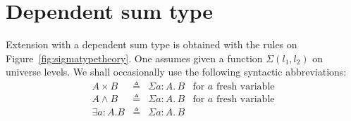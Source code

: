 \documentclass{article}
\newcommand{\defeq}{\triangleq}
\newcommand{\mksig}[3]{\Sigma {#1}\!:\!{#2}.\,{#3}}
\newcommand{\sigsort}[2]{\Sigma ({#1},{#2})}
\begin{document}
\section{Dependent sum type}

Extension with a dependent sum type is obtained with the rules on
Figure~\ref{fig:sigmatypetheory}. One assumes given a function
$\sigsort{l_1}{l_2}$ on universe levels. We shall occasionally use
the following syntactic abbreviations:
$$
\begin{array}{lcll}
A \times B & \defeq & \mksig{a}{A}{B} & \mbox{for $a$ fresh variable}\\
A \wedge B & \defeq & \mksig{a}{A}{B} & \mbox{for $a$ fresh variable}\\
\exists a:A. B & \defeq & \mksig{a}{A}{B}\\
\end{array}
$$
\end{document}
